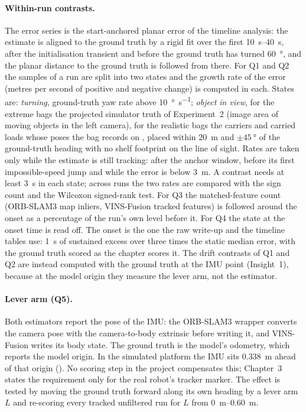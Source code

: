 \documentclass[11pt,a4paper,notitlepage]{report}
\begin{document}
\paragraph{Within-run contrasts.} The error series is the start-anchored planar
error of the timeline analysis: the estimate is aligned to the ground truth by a
rigid fit over the first \SIrange{10}{40}{\second}, after the initialisation
transient and before the ground truth has turned \SI{60}{\degree}, and the
planar distance to the ground truth is followed from there. For Q1 and Q2 the
samples of a run are split into two states and the growth rate of the error
(metres per second of positive and negative change) is computed in each. States
are: \emph{turning}, ground-truth yaw rate above \SI{10}{\degree\per\second};
\emph{object in view}, for the extreme bags the projected simulator truth of
Experiment~2 (image area of moving objects in the left camera), for the realistic
bags the carriers and carried loads whose poses the bag records on
, placed within \SI{20}{\metre} and
$\pm\SI{45}{\degree}$ of the ground-truth heading with no shelf footprint on the
line of sight. Rates are taken only while the estimate is still tracking: after
the anchor window, before its first impossible-speed jump and while the error is
below \SI{3}{\metre}. A contrast needs at least \SI{3}{\second} in each state;
across runs the two rates are compared with the sign count and the Wilcoxon
signed-rank test. For Q3 the matched-feature count (ORB-SLAM3 map inliers,
VINS-Fusion tracked features) is followed around the onset as a percentage of
the run's own level before it. For Q4 the state at the onset time is read off.
The onset is the one the raw write-up and the timeline tables use: \SI{1}{\second}
of sustained excess over three times the static median error, with the ground
truth scored as the chapter scores it. The drift contrasts of Q1 and Q2 are
instead computed with the ground truth at the IMU point (Insight~1), because at
the model origin they measure the lever arm, not the estimator.

\paragraph{Lever arm (Q5).} Both estimators report the pose of the IMU: the
ORB-SLAM3 wrapper converts the camera pose with the camera-to-body extrinsic
before writing it, and VINS-Fusion writes its body state. The ground truth is the
model's odometry, which reports the model origin. In the simulated platform the
IMU sits \SI{0.338}{\metre} ahead of that origin
(). No scoring step in the project
compensates this; Chapter~3 states the requirement only for the real robot's
tracker marker. The effect is tested by moving the ground truth forward along
its own heading by a lever arm $L$ and re-scoring every tracked unfiltered run
for $L$ from \SIrange{0}{0.60}{\metre}.
\end{document}
